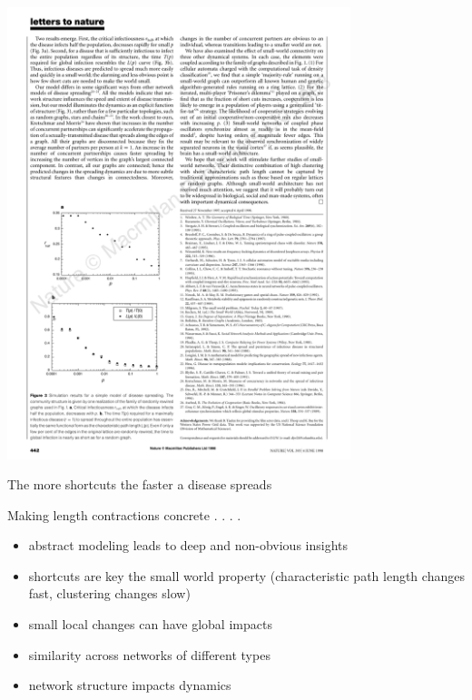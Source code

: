 \documentclass[aspectratio=169]{beamer}
\begin{document}
\begin{frame}

\begin{center}
\includegraphics[width = 0.75\textwidth]{figures/watts_collective_1998_fig3b}
\end{center}

\pause

The more shortcuts the faster a disease spreads 


\end{frame}
\begin{frame}

Making length contractions concrete . . . .


\end{frame}
\begin{frame}

\begin{itemize}
\item abstract modeling leads to deep and non-obvious insights
\pause
\item shortcuts are key the small world property (characteristic path length changes fast, clustering changes slow)
\pause
\item small local changes can have global impacts
\pause
\item similarity across networks of different types
\pause
\item network structure impacts dynamics 
\end{itemize}

\end{frame}
\end{document}
